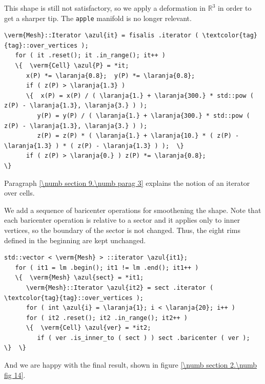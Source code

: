 This shape is still not satisfactory, so we apply a deformation in $ \mathbb{R}^3 $ in order to
get a sharper tip.
The {\small\tt apple} manifold is no longer relevant.

\begin{Verbatim}[commandchars=\\\{\},formatcom=\small\tt,frame=single,
   label=parag-\ref{\numb section 2.\numb parag 11}.cpp,rulecolor=\color{coment},
   baselinestretch=0.94,framesep=2mm]
   \verm{Mesh}::Iterator \azul{it} = fisalis .iterator ( \textcolor{tag}{tag}::over_vertices );
   for ( it .reset(); it .in_range(); it++ )
   \{  \verm{Cell} \azul{P} = *it;
      x(P) *= \laranja{0.8};  y(P) *= \laranja{0.8};
      if ( z(P) > \laranja{1.3} )
      \{  x(P) = x(P) / ( \laranja{1.} + \laranja{300.} * std::pow ( z(P) - \laranja{1.3}, \laranja{3.} ) );
         y(P) = y(P) / ( \laranja{1.} + \laranja{300.} * std::pow ( z(P) - \laranja{1.3}, \laranja{3.} ) );
         z(P) = z(P) * ( \laranja{1.} + \laranja{10.} * ( z(P) - \laranja{1.3} ) * ( z(P) - \laranja{1.3} ) );  \}
      if ( z(P) > \laranja{0.} ) z(P) *= \laranja{0.8};                                        \}
\end{Verbatim}

Paragraph \ref{\numb section 9.\numb parag 3} explains the notion of an iterator over cells.

We add a sequence of baricenter operations for smoothening the shape.
Note that each baricenter operation is relative to a sector and it applies only to inner
vertices, so the boundary of the sector is not changed.
Thus, the eight rims defined in the beginning are kept unchanged.

\begin{Verbatim}[commandchars=\\\{\},formatcom=\small\tt,frame=single,
   label=parag-\ref{\numb section 2.\numb parag 11}.cpp,rulecolor=\color{coment},
   baselinestretch=0.94,framesep=2mm]
   std::vector < \verm{Mesh} > ::iterator \azul{it1};
   for ( it1 = lm .begin(); it1 != lm .end(); it1++ )
   \{  \verm{Mesh} \azul{sect} = *it1;
      \verm{Mesh}::Iterator \azul{it2} = sect .iterator ( \textcolor{tag}{tag}::over_vertices );
      for ( int \azul{i} = \laranja{1}; i < \laranja{20}; i++ )
      for ( it2 .reset(); it2 .in_range(); it2++ )
      \{  \verm{Cell} \azul{ver} = *it2;
         if ( ver .is_inner_to ( sect ) ) sect .baricenter ( ver );  \}  \}
\end{Verbatim}

And we are happy with the final result, shown in figure \ref{\numb section 2.\numb fig 14}.

